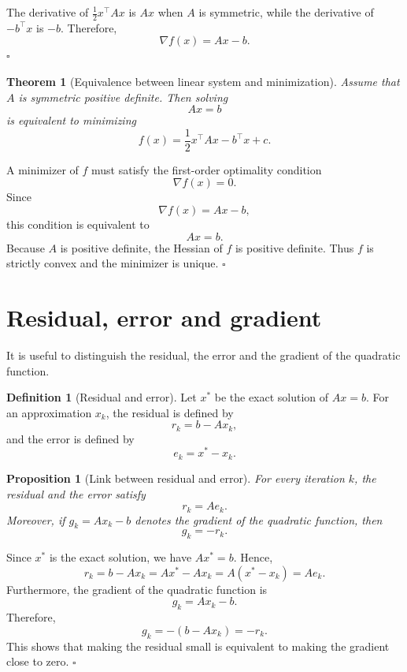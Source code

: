 \documentclass[11pt,a4paper]{report}
\theoremstyle{definition}
\newtheorem{definition}{Definition}[chapter]
\theoremstyle{plain}
\newtheorem{theorem}{Theorem}[chapter]
\newtheorem{proposition}{Proposition}[chapter]
\theoremstyle{remark}
\renewenvironment{proof}[1][Proof]{%
  \begin{tcolorbox}[enhanced, breakable, colback=white, colframe=black!25, boxrule=0.5pt, arc=1.5mm, borderline west={2pt}{0pt}{black!45}, title=\textbf{#1}, coltitle=bleufonce, fonttitle=\bfseries]
}{%
  \hfill$\square$\end{tcolorbox}
}
\begin{document}
\begin{proof}
The derivative of $\frac12 x^\top A x$ is $Ax$ when $A$ is symmetric, while the derivative of $-b^\top x$ is $-b$. Therefore,
\[
\nabla f(x)=Ax-b.
\]
\end{proof}

\begin{theorem}[Equivalence between linear system and minimization]
Assume that $A$ is symmetric positive definite. Then solving
\[
Ax=b
\]
is equivalent to minimizing
\[
f(x)=\frac12 x^\top A x-b^\top x+c.
\]
\end{theorem}

\begin{proof}
A minimizer of $f$ must satisfy the first-order optimality condition
\[
\nabla f(x)=0.
\]
Since
\[
\nabla f(x)=Ax-b,
\]
this condition is equivalent to
\[
Ax=b.
\]
Because $A$ is positive definite, the Hessian of $f$ is positive definite. Thus $f$ is strictly convex and the minimizer is unique.
\end{proof}



\section{Residual, error and gradient}

It is useful to distinguish the residual, the error and the gradient of the quadratic function.

\begin{definition}[Residual and error]
Let $x^\ast$ be the exact solution of $Ax=b$. For an approximation $x_k$, the residual is defined by
\[
r_k=b-Ax_k,
\]
and the error is defined by
\[
e_k=x^\ast-x_k.
\]
\end{definition}

\begin{proposition}[Link between residual and error]
For every iteration $k$, the residual and the error satisfy
\[
r_k=Ae_k.
\]
Moreover, if $g_k=Ax_k-b$ denotes the gradient of the quadratic function, then
\[
g_k=-r_k.
\]
\end{proposition}

\begin{proof}
Since $x^\ast$ is the exact solution, we have $Ax^\ast=b$. Hence,
\[
r_k=b-Ax_k=Ax^\ast-Ax_k=A(x^\ast-x_k)=Ae_k.
\]
Furthermore, the gradient of the quadratic function is
\[
g_k=Ax_k-b.
\]
Therefore,
\[
g_k=-(b-Ax_k)=-r_k.
\]
This shows that making the residual small is equivalent to making the gradient close to zero.
\end{proof}
\end{document}
